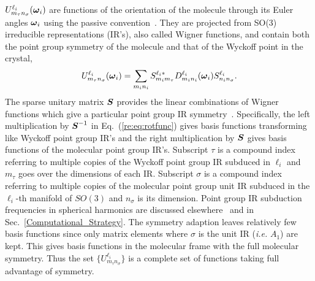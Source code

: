 \documentclass[preprint]{revtex4}
\newcommand{\mb}[1]{\ensuremath{\mbox{\boldmath $ #1 $}}}
\begin{document}
$U^{\ell_i}_{m_\tau n_\sigma}(\mb{\omega}_i)$ are functions of the
orientation of the molecule through its Euler angles $\mb{\omega}_i$
using the passive convention~\cite{Varshalovich88}.  They are
projected from SO(3) irreducible representations (IR's), also called
Wigner functions, and contain both the point group symmetry of the
molecule and that of the Wyckoff point in the crystal,
\begin{equation}
\label{re:eq:rotfunc}U^{\ell_i}_{m_\tau
n_\sigma}(\mb{\omega}_i)=\sum_{m_i n_i}S^{\ell_i*}_{m_im_\tau}D_{m_i
n_i}^{\ell_i}(\mb{\omega}_i)S^{\ell_i}_{n_in_\sigma}.
\end{equation}
The sparse unitary matrix $\mb{S}$ provides the linear combinations
of Wigner functions which give a particular point group IR
symmetry~\cite{Bradley72}.  Specifically, the left multiplication by
$\mb{S}^{-1}$ in Eq.~(\ref{re:eq:rotfunc}) gives basis functions
transforming like Wyckoff point group IR's and the right
multiplication by $\mb{S}$ gives basis functions of the molecular
point group IR's. Subscript $\tau$ is a compound index referring to
multiple copies of the Wyckoff point group IR subduced in $\ell_i$
and $m_\tau$ goes over the dimensions of each IR. Subscript $\sigma$
is a compound index referring to multiple copies of the molecular
point group unit IR subduced in the $\ell_i$-th manifold of $SO(3)$
and $n_\sigma$ is its dimension. Point group IR subduction
frequencies in spherical harmonics are discussed
elsewhere~\cite{Bradley72} and in Sec.~\ref{Computational_Strategy}.
The symmetry adaption leaves relatively few basis functions since
only matrix elements where $\sigma$ is the unit IR (\emph{i.e.}
$A_1$) are kept.  This gives basis functions in the molecular frame
with the full molecular symmetry.  Thus the set
$\{U^{\ell_i}_{m_\tau n_\sigma}\}$ is a complete set of functions
taking full advantage of symmetry.
\end{document}
